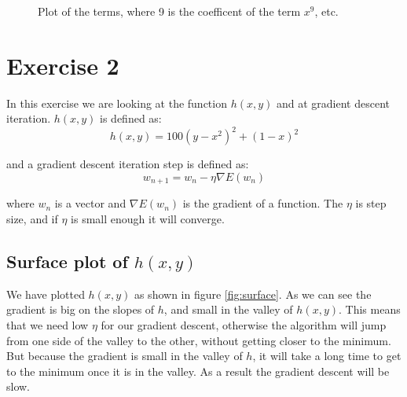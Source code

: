 \documentclass[11pt]{article}
\begin{document}
\begin{figure}[H]
	\centering
		\centering
		\caption{Plot of the terms, where 9 is the coefficent of the term $x^9$, etc.} 
	\label{fig:highorder}
\end{figure}

\section{Exercise 2}
In this exercise we are looking at the function $h(x,y)$ and at gradient descent iteration. $h(x,y)$ is defined as:
\[
h(x,y) = 100(y - x^2)^2 + (1 - x)^2
\]

and a gradient descent iteration step is defined as:
\[
w_{n+1} = w_n - \eta \nabla E(w_n)
\]

where $w_n$ is a vector and $\nabla E(w_n)$ is the gradient of a function. The $\eta$ is  step size, and if $\eta$ is small enough it will converge. 


\subsection{Surface plot of $h(x,y)$}
We have plotted $h(x,y)$ as shown in figure \ref{fig:surface}. As we can see the gradient is  big on the slopes of $h$, and small in the valley of $h(x,y)$. This means that we need low $\eta$ for our gradient descent, otherwise the algorithm will jump from one side of the valley to the other, without getting closer to the minimum. But because the gradient is small in the valley of $h$, it will take a long time to get to the minimum once it is in the valley. As a result the gradient descent will be slow.
\end{document}
